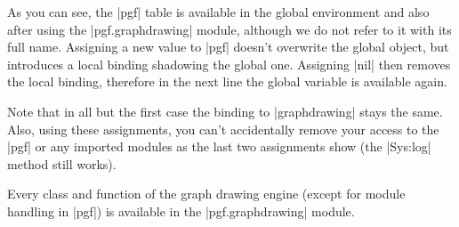 As you can see, the |pgf| table is available in the global environment
and also after using the |pgf.graphdrawing| module, although we do not 
refer to it with its full name.  Assigning a new value to |pgf|
doesn't overwrite the global object, but introduces a local binding
shadowing the global one. Assigning |nil| then removes the local
binding, therefore in the next line the global variable is available
again.

Note that in all but the first case the binding to |graphdrawing|
stays the same.  Also, using these assignments, you can't accidentally
remove your access to the |pgf| or any imported modules as the last
two assignments show (the |Sys:log| method still works).

Every class and function of the graph drawing engine (except for
module handling in |pgf|) is available in the |pgf.graphdrawing|
module. 


